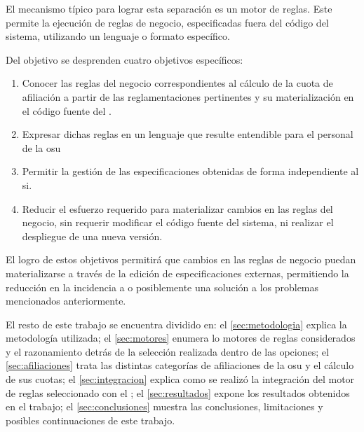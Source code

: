El mecanismo típico para lograr esta separación es un motor de reglas. 
Este permite la ejecución de reglas de negocio, especificadas fuera del código del sistema, utilizando un lenguaje o formato específico.


Del objetivo se desprenden cuatro objetivos específicos:
\begin{enumerate}
    \item \label{obj:esp:extraer}
    Conocer las reglas del negocio correspondientes al cálculo de la cuota de afiliación a partir de las reglamentaciones pertinentes y su materialización en el código fuente del {\SIDOSPU}.
    \item \label{obj:esp:intelegible}
    Expresar dichas reglas en un lenguaje que resulte entendible para el personal de la \acrlong{osu}
    \item \label{obj:esp:independiente}
    Permitir la gestión de las especificaciones obtenidas de forma independiente al \acrshort{si}.
    \item \label{obj:esp:esfuerzo}
    Reducir el esfuerzo requerido para materializar cambios en las reglas del negocio, sin requerir modificar el código fuente del sistema, ni realizar el despliegue de una nueva versión.
\end{enumerate}

El logro de estos objetivos permitirá que cambios en las reglas de negocio puedan materializarse a través de la edición de especificaciones externas,  permitiendo la reducción en la incidencia a o posiblemente una solución a los problemas mencionados anteriormente.




El resto de este trabajo se encuentra dividido en:
el \cref{sec:metodologia} explica la metodología utilizada; 
el \cref{sec:motores} enumera lo motores de reglas considerados y el razonamiento detrás de la selección realizada dentro de las opciones;
el \cref{sec:afiliaciones} trata las distintas categorías de afiliaciones de la \acrshort{osu} y el cálculo de sus cuotas;
el \cref{sec:integracion} explica como se realizó la integración del motor de reglas seleccionado con el {\SIOSU};
el \cref{sec:resultados} expone los resultados obtenidos en el trabajo;
el \cref{sec:conclusiones} muestra las conclusiones, limitaciones y posibles continuaciones de este trabajo.